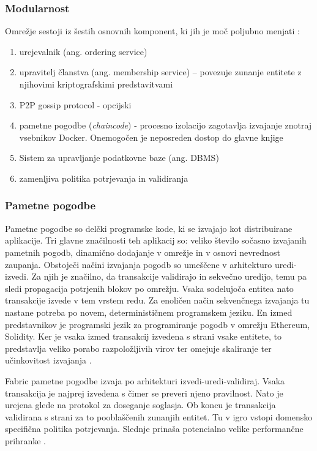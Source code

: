 \documentclass[a4paper, 12pt]{book}
\begin{document}
\subsubsection{Modularnost}
Omrežje sestoji iz šestih osnovnih komponent, ki jih je moč poljubno menjati \cite{hyperledgerDocs}:
\begin{enumerate}
	\item urejevalnik (ang. ordering service)
	\item upravitelj članstva (ang. membership service) -- povezuje zunanje entitete z njihovimi kriptografskimi predstavitvami
	\item P2P gossip protocol - opcijski
	\item pametne pogodbe (\textit{chaincode}) - procesno izolacijo zagotavlja izvajanje znotraj vsebnikov Docker. 
	Onemogočen je neposreden dostop do glavne knjige
	\item Sistem za upravljanje podatkovne baze (ang. DBMS)
	\item zamenljiva politika potrjevanja in validiranja
\end{enumerate}

\subsubsection{Pametne pogodbe}
Pametne pogodbe so delčki programske kode, ki se izvajajo kot distribuirane aplikacije.
Tri glavne značilnosti teh aplikacij so: veliko število sočasno izvajanih pametnih pogodb, dinamično dodajanje v omrežje in v osnovi nevrednost zaupanja.
Obstoječi načini izvajanja pogodb so umeščene v arhitekturo uredi-izvedi.
Za njih je značilno, da transakcije validirajo in sekvečno uredijo, temu pa sledi propagacija potrjenih blokov po omrežju.
Vsaka sodelujoča entitea nato transakcije izvede v tem vrstem redu.
Za enoličen način sekvenčnega izvajanja tu nastane potreba po novem, determinističnem programskem jeziku.
En izmed predstavnikov je programski jezik za programiranje pogodb v omrežju Ethereum, Solidity.
Ker je vsaka izmed transakcij izvedena s strani vsake entitete, to predstavlja veliko porabo razpoložljivih virov ter omejuje skaliranje ter učinkovitost izvajanja \cite{hyperledgerDocs}.

Fabric pametne pogodbe izvaja po arhitekturi izvedi-uredi-validiraj.
Vsaka transakcija je najprej izvedena s čimer se preveri njeno pravilnost.
Nato je urejena glede na protokol za doseganje soglasja.
Ob koncu je transakcija validirana s strani za to pooblaščenih zunanjih entitet.
Tu v igro vstopi domensko specifična politika potrjevanja.
Slednje prinaša potencialno velike performančne prihranke \cite{hyperledgerDocs}.
\end{document}
